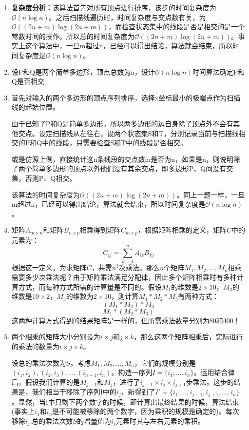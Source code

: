 \documentclass[12pt,a4paper]{article}
\makeatletter
\newtheorem*{solution}{Solution}
\theoremstyle{definition}
\renewenvironment{solution}[1][Solution] {\par\pushQED{\qed}\normalfont\topsep6\p@\@plus6\p@\relax\trivlist\item[\hskip\labelsep\bfseries#1\@addpunct{.}]\ignorespaces}{\popQED\endtrivlist\@endpefalse} \makeatother
\makeatother
\begin{document}
\begin{enumerate}
\begin{solution}
	
	\textbf{复杂度分析：}该算法首先对所有顶点进行排序，该步的时间复杂度为$\mathcal{O}(n\log n)$。之后扫描线遍历时，时间复杂度与交点数有关，为$\mathcal{O}((2n+m)\log(2n+m))$，而检查状态集中的线段是否是相交的是一个常数时间的操作。所以总的时间复杂度为$\mathcal{O}((2n+m)\log(2n+m))$。事实上这个算法中，一旦m超过n，已经可以得出结论，算法就会结束，所以时间复杂度是$\mathcal{O}(n\log n)$。
\end{solution}

\item 设P和Q是两个简单多边形，顶点总数为n，设计$\mathcal{O}(n\log n)$时间算法确定P和Q是否相交
\begin{solution}
	首先对输入的两个多边形的顶点序列排序，选择x坐标最小的极端点作为扫描线的起始位置。
	
	由于已知了P和Q是简单多边形，所以两多边形的边自身除了顶点外不会有其他交点。设定扫描线从左往右，设两个状态集S和T，分别记录当前与扫描线相交的P和Q中的线段，只需要检查S和T中的线段是否相交。
	
	或是仿照上例，直接统计这n条线段的交点数m是否为n，如果是n，则说明除了两个简单多边形的顶点以外他们没有其余交点，即多边形P、Q间没有交集，否则P、Q相交。
	
	该算法的时间复杂度为$\mathcal{O}((2n+m)\log(2n+m))$。同上一题一样，一旦m超过n，已经可以得出结论，算法就会结束，所以时间复杂度是$\mathcal{O}(n\log n)$。
\end{solution}

\item 矩阵$A_{m\times n}$和矩阵$B_{n\times p}$相乘得到矩阵$C_{m\times p}$，根据矩阵相乘的定义，矩阵$C$中的元素为：
$$C_{ij}=\sum_{k=1}^n{A_{ik}B_{kj}}
$$
根据这一定义，为求矩阵$C$，共需$n^3$次乘法。那么$n$个矩阵$M_1,M_2,\ldots,M_n$相乘需要多少次乘法呢？由于矩阵乘法满足分配律，因此多个矩阵相乘时有多种计算方式，而每种方式所需的计算量是不同的。假设$M_1$的维数是$2\times10$，$M_2$的维数是$10\times2$，$M_3$的维数为$2\times10$，则计算$M_1*M_2*M_3$有两种方式：
$$(M_1*M_2)*M_3$$ 
$$M_1*(M_2*M_3)$$
这两种计算方式得到的结果矩阵是一样的，但所需乘法数量分别为80和400！
\begin{solution}
	两个相乘的矩阵大小分别设为$i\times j$和$j\times k$，那么这两个矩阵相乘后，实际进行的乘法的数量为$i\times j\times k$。
	
	设总的乘法次数为$S$。考虑$M_1,M_2,\ldots,M_n$，它们的规模分别是$(i_1,i_2),(i_2,i_3),\ldots,(i_{n-1},i_n)$。构造一序列$I=\{i_1,\ldots,i_n\}$。运用结合律后，假设我们计算的是$M_{j-1}$和$M_{j}$，进行了$i_{j-1}\times i_j\times i_{j+1}$步乘法。这步的结果是，我们相当于移除了序列I中的$i_j$，新得到了$I'=\{i_1,\ldots,i_{j-1},i_{j+1},\ldots,i_n\}$。显然，当I中只剩下两个数字的时候，即计算出最终结果的时候，算法结束(事实上$i_1$和$i_n$是不可能被移除的两个数字，因为乘积的规模是确定的)。每次移除$i_j$,总的乘法次数$S$的增量值为$i_j$元素时其与左右元素的乘积。
	

\end{solution}
\end{enumerate}
\end{document}
